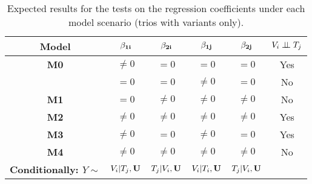 \documentclass[12pt]{report}
\begin{document}
\begin{table}[H]
\centering
\caption{ Expected results for the tests on the regression coefficients under each model scenario (trios with variants only).}
\begin{tabular}{|c||cccc|c|}
\hline
\bf Model  & $\bf\beta_{1i}$  &  $\bf\beta_{2i}$   & $\bf\beta_{1j}$    & $\bf\beta_{2j}$    & $ V_i \perp \!\!\! \perp T_j$    \\ \hline \hline
\bf M0      &  $\neq 0$            & $= 0$                  & $=0$                    & $=0$                    & Yes   \\ \hline 
               &  $= 0$                & $= 0$                  & $\neq 0$                & $= 0$                  & No     \\ \hline
\bf M1      &  $= 0$                &  $\neq 0$             & $\neq0$                & $ \neq 0$             & No     \\ \hline
\bf M2      &   $\neq0$            &  $\neq 0$             & $\neq0$                & $\neq0$               & Yes   \\ \hline
\bf M3      &   $\neq 0$           &  $= 0$                 & $\neq0$                & $=0$                   & Yes   \\ \hline
\bf M4      &   $\neq0$            &  $\neq 0$             & $\neq0$                & $\neq0$               & No    \\ \hline \hline
\bf Conditionally:  $Y \sim$& $V_i|T_j,{\bf U}$  &  $T_j|V_i, {\bf U}$   & $V_i| T_i, {\bf U}$    & $T_j|V_i,{\bf U}$    &   \\ \hline 
\end{tabular}
\end{table}
\end{document}

